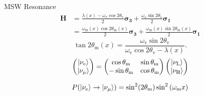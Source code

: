 \documentclass[9pt]{beamer}
\begin{document}
\begin{darkframes}
\begin{frame}{MSW Resonance}
\begin{align*}
    \mathbf{H} &= \frac{\lambda(x) -\omega_{\mathrm{v}} \cos 2\theta_{\mathrm{v}} }{2} \boldsymbol{\sigma_3}  + \frac{ \omega_{\mathrm{v}} \sin 2\theta_{\mathrm{v}}}{2}  \boldsymbol{\sigma_1} \\
    &=\frac{ \omega_{\mathrm{m}}(x)    \cos 2\theta_{\mathrm{m}}(x)  }{2} \boldsymbol{\sigma_3} + \frac{ \omega_{\mathrm{m}}(x)    \sin 2\theta_{\mathrm{m}}(x)  }{2} \boldsymbol{\sigma_1}
\end{align*}
%
\begin{equation*}
\tan 2\theta_{\mathrm{m}}(x) =  \frac{\omega_{\mathrm{v}} \sin 2\theta_{\mathrm{v}}  }{ \omega_{\mathrm{v}}\cos 2\theta_{\mathrm{v}} - \lambda(x)  }.
\end{equation*}
%
\begin{equation*}
\begin{pmatrix}
\left| \nu_{\mathrm{e}}\right\rangle \\
\left| \nu_{\mu}\right\rangle
\end{pmatrix} =
\begin{pmatrix}
\cos\theta_{\mathrm m} & \sin\theta_{\mathrm m} \\
-\sin\theta_{\mathrm m} & \cos\theta_{\mathrm m}
\end{pmatrix}\begin{pmatrix}
\left| \nu_{\mathrm{L}}\right\rangle \\
\left| \nu_{\mathrm{H}}\right\rangle
\end{pmatrix}
\end{equation*}







\begin{tcolorbox}[title=Transition Probability]
\begin{equation*}
P(\left| \nu_{\mathrm{e}}\right\rangle\to\left| \nu_\mu\right\rangle)  =  \sin^2(2\theta_{\mathrm{m}}) \sin^2 \left( \omega_{\mathrm{m}} x \right)
\end{equation*}

\end{tcolorbox}





\end{frame}





\end{darkframes}
\end{document}
